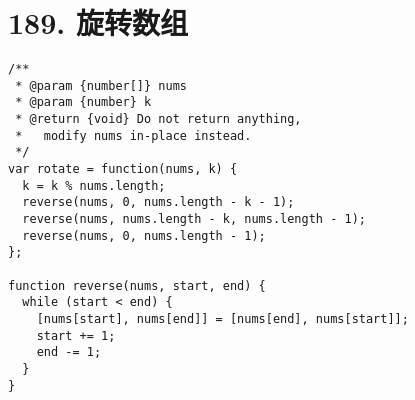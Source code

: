\newpage
\section{189. 旋转数组}
\label{leetcode:189}

\begin{verbatim}
/**
 * @param {number[]} nums
 * @param {number} k
 * @return {void} Do not return anything, 
 *   modify nums in-place instead.
 */
var rotate = function(nums, k) {
  k = k % nums.length;
  reverse(nums, 0, nums.length - k - 1);
  reverse(nums, nums.length - k, nums.length - 1);
  reverse(nums, 0, nums.length - 1);
};

function reverse(nums, start, end) {
  while (start < end) {
    [nums[start], nums[end]] = [nums[end], nums[start]];
    start += 1;
    end -= 1;
  }
}
\end{verbatim}
